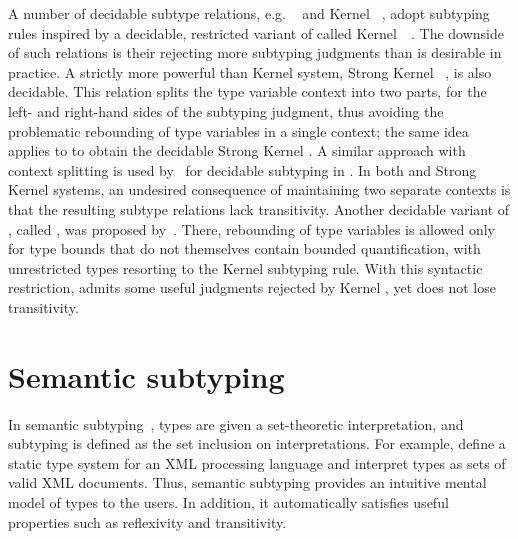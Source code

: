 A number of decidable subtype relations,
e.g. \WyvSelf~\cite{bib:mackay:path-dep-dec:2020}
and Kernel \DSub~\cite{bib:hu:dot-undec:2020},
adopt subtyping rules inspired by a decidable, restricted variant of \FSub
called Kernel~\FSub~\cite{bib:cardelli:types-poly:1985}.
The downside of such relations is their rejecting more subtyping judgments
than is desirable in practice.
A strictly more powerful than Kernel \DSub system,
Strong Kernel \DSub~\cite{bib:hu:dot-undec:2020}, is also decidable.
This relation splits the type variable context into two parts, for the left-
and right-hand sides of the subtyping judgment, thus avoiding the problematic
rebounding of type variables in a single context;
the same idea applies to \FSub to obtain the decidable Strong Kernel \FSub.
A similar approach with context splitting is used
by~\citet{bib:mackay:path-dep-dec:2020} for decidable subtyping in \WyvFix.
In both \WyvFix and Strong Kernel systems,
an undesired consequence of maintaining two separate contexts
is that the resulting subtype relations lack transitivity.
Another decidable variant of \FSub, called \FSubR, was proposed
by~\citet{bib:mackay:bound-poly-sub-dec:2020}. There, %
rebounding of type variables is allowed
only for type bounds that do not themselves contain bounded quantification,
with unrestricted types resorting to the Kernel subtyping rule.
With this syntactic restriction, \FSubR admits some useful judgments
rejected by Kernel \FSub, yet does not lose transitivity.

\section{Semantic subtyping}

In semantic subtyping~\cite{bib:frisch:sem-sub:2008}, types are given a set-theoretic
interpretation, and subtyping is defined as the set inclusion on
interpretations.
For example, \citet{bib:hosoya:reg-types-XML:2000} define a static type system for
an XML processing language and interpret types as sets of valid XML documents.
Thus, semantic subtyping provides an intuitive mental
model of types to the users. In addition, it automatically satisfies
useful properties such as reflexivity and transitivity.


